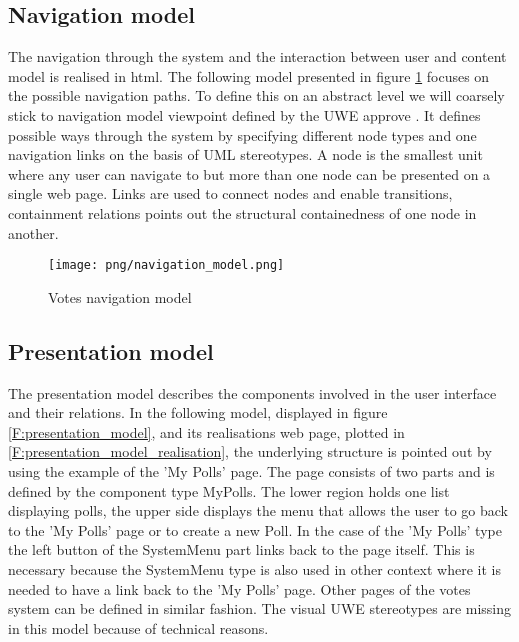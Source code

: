 \subsection{Navigation model}
The navigation through the system and the interaction between user and content model is realised in html. The following model presented in figure \ref{F:navigation_model} focuses on the possible navigation paths. To define this on an abstract level we will coarsely stick to navigation model viewpoint defined by the UWE approve \cite{Uwe08,uweref}. It defines possible ways through the system by specifying different node types and one navigation links on the basis of UML stereotypes. A node is the smallest unit where any user can navigate to but more than one node can be presented on a single web page. Links are used to connect nodes and enable transitions, containment relations points out the structural containedness of one node in another.

\begin{figure}
\centering
\texttt{[image: png/navigation\_model.png]}
\caption{Votes navigation model}
\label{F:navigation_model}
\end{figure}

\subsection{Presentation model}

The presentation model describes the components involved in the user interface and their relations. In the following model, displayed in figure \ref{F:presentation_model}, and its realisations web page, plotted in \ref{F:presentation_model_realisation}, the underlying structure is pointed out by using the example of the 'My Polls' page. The page consists of two parts and is defined by the component type MyPolls. The lower region holds one list displaying polls, the upper side displays the menu that allows the user to go back to the 'My Polls' page or to create a new Poll. In the case of the 'My Polls' type the left button of the SystemMenu part links back to the page itself. This is necessary because the SystemMenu type is also used in other context where it is needed to have a link back to the 'My Polls' page. Other pages of the votes system can be defined in similar fashion. The visual UWE stereotypes are missing in this model because of technical reasons.

